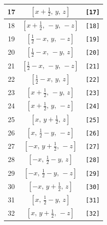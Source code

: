 \documentclass[fleqn,8pt]{jsarticle}
\begin{document}
\begin{longtable}{ccc}
17 & $\left[ x + \frac{1}{2},\, y,\, z \right]$ & {\tt [17]} \\ \hline
18 & $\left[ x + \frac{1}{2},\, - y,\, - z \right]$ & {\tt [18]} \\ \hline
19 & $\left[ \frac{1}{2} - x,\, y,\, - z \right]$ & {\tt [19]} \\ \hline
20 & $\left[ \frac{1}{2} - x,\, - y,\, z \right]$ & {\tt [20]} \\ \hline
21 & $\left[ \frac{1}{2} - x,\, - y,\, - z \right]$ & {\tt [21]} \\ \hline
22 & $\left[ \frac{1}{2} - x,\, y,\, z \right]$ & {\tt [22]} \\ \hline
23 & $\left[ x + \frac{1}{2},\, - y,\, z \right]$ & {\tt [23]} \\ \hline
24 & $\left[ x + \frac{1}{2},\, y,\, - z \right]$ & {\tt [24]} \\ \hline
25 & $\left[ x,\, y + \frac{1}{2},\, z \right]$ & {\tt [25]} \\ \hline
26 & $\left[ x,\, \frac{1}{2} - y,\, - z \right]$ & {\tt [26]} \\ \hline
27 & $\left[ - x,\, y + \frac{1}{2},\, - z \right]$ & {\tt [27]} \\ \hline
28 & $\left[ - x,\, \frac{1}{2} - y,\, z \right]$ & {\tt [28]} \\ \hline
29 & $\left[ - x,\, \frac{1}{2} - y,\, - z \right]$ & {\tt [29]} \\ \hline
30 & $\left[ - x,\, y + \frac{1}{2},\, z \right]$ & {\tt [30]} \\ \hline
31 & $\left[ x,\, \frac{1}{2} - y,\, z \right]$ & {\tt [31]} \\ \hline
32 & $\left[ x,\, y + \frac{1}{2},\, - z \right]$ & {\tt [32]} \\
\end{longtable}
\end{document}
